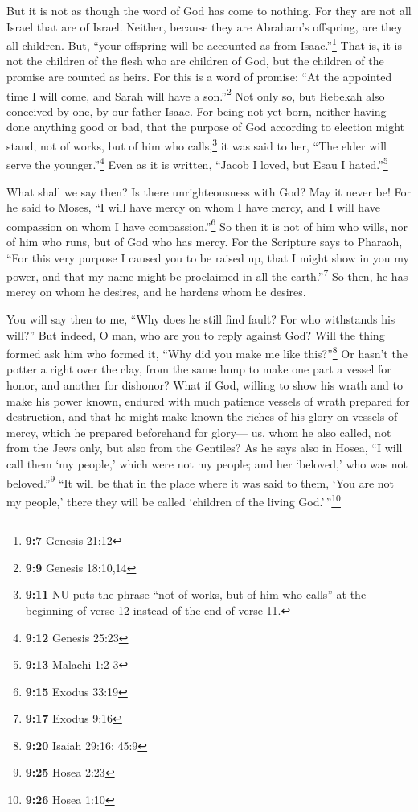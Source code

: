  But it is not as though the word of God has come to
nothing. For they are not all Israel that are of Israel. 
Neither, because they are Abraham's offspring, are they all children.
But, ``your offspring will be accounted as from Isaac.''\footnote{\textbf{9:7}
  Genesis 21:12}  That is, it is not the children of the
flesh who are children of God, but the children of the promise are
counted as heirs.  For this is a word of promise: ``At the
appointed time I will come, and Sarah will have a son.''\footnote{\textbf{9:9}
  Genesis 18:10,14}  Not only so, but Rebekah also
conceived by one, by our father Isaac.  For being not yet
born, neither having done anything good or bad, that the purpose of God
according to election might stand, not of works, but of him who
calls,\footnote{\textbf{9:11} NU puts the phrase ``not of works, but of
  him who calls'' at the beginning of verse 12 instead of the end of
  verse 11.}  it was said to her, ``The elder will serve
the younger.''\footnote{\textbf{9:12} Genesis 25:23} 
Even as it is written, ``Jacob I loved, but Esau I hated.''\footnote{\textbf{9:13}
  Malachi 1:2-3}

 What shall we say then? Is there unrighteousness with
God? May it never be!  For he said to Moses, ``I will
have mercy on whom I have mercy, and I will have compassion on whom I
have compassion.''\footnote{\textbf{9:15} Exodus 33:19} 
So then it is not of him who wills, nor of him who runs, but of God who
has mercy.  For the Scripture says to Pharaoh, ``For this
very purpose I caused you to be raised up, that I might show in you my
power, and that my name might be proclaimed in all the
earth.''\footnote{\textbf{9:17} Exodus 9:16}  So then, he
has mercy on whom he desires, and he hardens whom he desires.

 You will say then to me, ``Why does he still find fault?
For who withstands his will?''  But indeed, O man, who
are you to reply against God? Will the thing formed ask him who formed
it, ``Why did you make me like this?''\footnote{\textbf{9:20} Isaiah
  29:16; 45:9}  Or hasn't the potter a right over the
clay, from the same lump to make one part a vessel for honor, and
another for dishonor?  What if God, willing to show his
wrath and to make his power known, endured with much patience vessels of
wrath prepared for destruction,  and that he might make
known the riches of his glory on vessels of mercy, which he prepared
beforehand for glory---  us, whom he also called, not
from the Jews only, but also from the Gentiles?  As he
says also in Hosea, ``I will call them `my people,' which were not my
people; and her `beloved,' who was not beloved.''\footnote{\textbf{9:25}
  Hosea 2:23}  ``It will be that in the place where it
was said to them, `You are not my people,' there they will be called
`children of the living God.'\,''\footnote{\textbf{9:26} Hosea 1:10}

